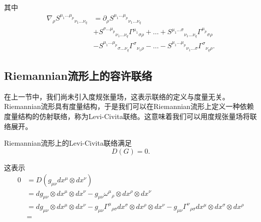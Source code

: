 \begin{definition}
\begin{equation}
			\end{equation}
			其中
			\begin{equation}
				\begin{split}
					\nabla_{\rho}{S^{\mu_1\dots\mu_p}}_{\nu_1\dots\nu_q}&=\partial_\rho{S^{\mu_1\dots\mu_p}}_{\nu_1\dots\nu_q}\\
					&+{S^{\sigma\dots\mu_p}}_{\nu_1\dots\nu_q}{\varGamma^{\mu_1}}_{\sigma\rho}+\dots+{S^{\mu_1\dots\sigma}}_{\nu_1\dots\nu_q}{\varGamma^{\mu_p}}_{\sigma\rho}\\
					&-{S^{\mu_1\dots\mu_p}}_{\sigma\dots\nu_q}{\varGamma^{\sigma}}_{\nu_1\rho}-\dots-{S^{\mu_1\dots\mu_p}}_{\nu_1\dots\sigma}{\varGamma^{\sigma}}_{\nu_q\rho}.
				\end{split}		
			\end{equation}
		\end{definition}
	\subsection{Riemannian流形上的容许联络}
		在上一节中，我们尚未引入度规张量场，这表示联络的定义与度量无关。Riemannian流形具有度量结构，于是我们可以在Riemannian流形上定义一种依赖度量结构的仿射联络，称为Levi-Civita联络。这意味着我们可以用度规张量场将联络展开。
		\begin{definition}
			Riemannian流形上的Levi-Civita联络满足
			\begin{equation}
				D(G)=0.
			\end{equation}
		\end{definition}
		这表示
		\begin{equation}
			\begin{split}
				0&=D(g_{\mu\nu}dx^\mu\otimes dx^\nu)\\
				&=dg_{\mu\nu}\otimes dx^\mu\otimes dx^\nu-g_{\mu\nu}{\omega^\mu}_\rho\otimes dx^\rho\otimes dx^\nu\\
				&=dg_{\mu\nu}\otimes dx^\mu\otimes dx^\nu-g_{\mu\nu}{\varGamma^\mu}_{\rho\sigma}dx^\sigma\otimes dx^\rho\otimes dx^\nu-g_{\mu\nu}{\varGamma^\nu}_{\rho\sigma}dx^\mu\otimes dx^\sigma\otimes dx^\rho\\
				&=
			\end{split}
		\end{equation}